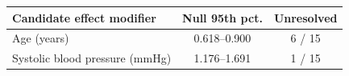 \begin{tabular}{lcc}
\toprule
\textbf{Candidate effect modifier} & \textbf{Null 95th pct.} & \textbf{Unresolved} \\
\midrule
Age (years) & 0.618--0.900 & 6 / 15 \\
Systolic blood pressure (mmHg) & 1.176--1.691 & 1 / 15 \\
\bottomrule
\end{tabular}
